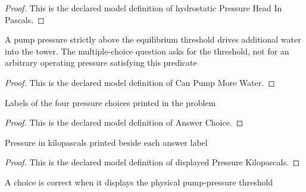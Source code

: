 \begin{proof}
  This is the declared model definition of hydrostatic Pressure Head In Pascals.
\end{proof}
\begin{definition}
  \label{def:physics:phyx-mini-0393:phyxminiproblems-problemphyxmini0393-canpumpmorewater}
  A pump pressure strictly above the equilibrium threshold drives additional water into the tower. The multiple-choice question asks for the threshold, not for an arbitrary operating pressure satisfying this predicate
\end{definition}
\begin{proof}
  This is the declared model definition of Can Pump More Water.
\end{proof}
\begin{definition}
  \label{def:physics:phyx-mini-0393:phyxminiproblems-problemphyxmini0393-answerchoice}
  Labels of the four pressure choices printed in the problem
\end{definition}
\begin{proof}
  This is the declared model definition of Answer Choice.
\end{proof}
\begin{definition}
  \label{def:physics:phyx-mini-0393:phyxminiproblems-problemphyxmini0393-answerchoice-displayedpressurekilopascals}
  Pressure in kilopascals printed beside each answer label
\end{definition}
\begin{proof}
  This is the declared model definition of displayed Pressure Kilopascals.
\end{proof}
\begin{definition}
  \label{def:physics:phyx-mini-0393:phyxminiproblems-problemphyxmini0393-iscorrectanswer}
  A choice is correct when it displays the physical pump-pressure threshold
\end{definition}
